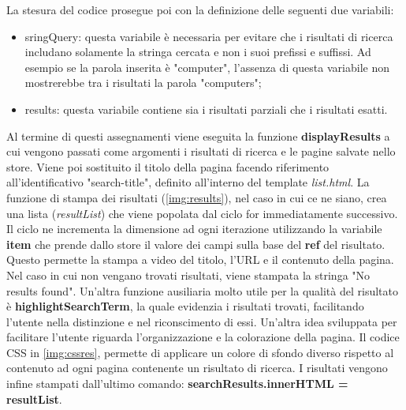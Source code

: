 \documentclass[target=bach,aauheader=]{thud}
\begin{document}
\begin{enumerate}
    \newline \newline
    La stesura del codice prosegue poi con la definizione delle seguenti due variabili:
    \begin{itemize}
        \item sringQuery: questa variabile è necessaria per evitare che i risultati di ricerca includano solamente la stringa cercata e non i suoi prefissi e suffissi. Ad esempio se la parola inserita è "computer", l'assenza di questa variabile non mostrerebbe tra i risultati la parola "computers";
        \item results: questa variabile contiene sia i risultati parziali che i risultati esatti.
    \end{itemize}
    Al termine di questi assegnamenti viene eseguita la funzione \textbf{displayResults} a cui vengono passati come argomenti i risultati di ricerca e le pagine salvate nello store. Viene poi sostituito il titolo della pagina facendo riferimento all'identificativo "search-title", definito all'interno del template \textit{list.html}. 
    \newline \newline
    La funzione di stampa dei risultati (\cref{img:results}), nel caso in cui ce ne siano, crea una lista (\textit{resultList}) che viene popolata dal ciclo for immediatamente successivo. Il ciclo ne incrementa la dimensione ad ogni iterazione utilizzando la variabile \textbf{item} che prende dallo store il valore dei campi sulla base del \textbf{ref} del risultato. 
    Questo permette la stampa a video del titolo, l'URL e il contenuto della pagina. Nel caso in cui non vengano trovati risultati, viene stampata la stringa "No results found".
    \newline \newline
    Un'altra funzione ausiliaria molto utile per la qualità del risultato è \textbf{highlightSearchTerm}, la quale evidenzia i risultati trovati, facilitando l'utente nella distinzione e nel riconscimento di essi. 
    \newline
    Un'altra idea sviluppata per facilitare l'utente riguarda l'organizzazione e la colorazione della pagina. Il codice CSS in \cref{img:cssres}, permette di applicare un colore di sfondo diverso rispetto al contenuto ad ogni pagina contenente un risultato di ricerca. 
    \newline \newline
    I risultati vengono infine stampati dall'ultimo comando: \textbf{searchResults.innerHTML = resultList}.

\end{enumerate}
\end{document}
